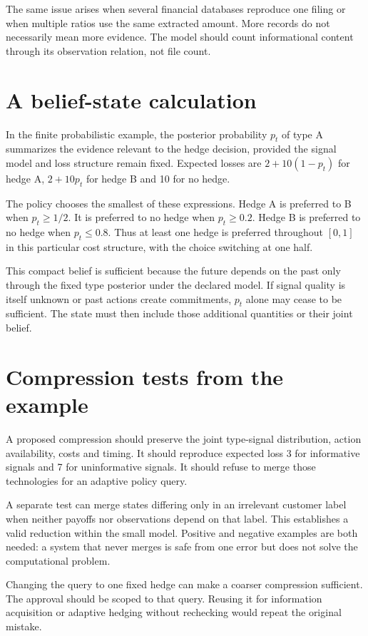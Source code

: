 The same issue arises when several financial databases reproduce one filing or when multiple ratios use the same extracted amount. More records do not necessarily mean more evidence. The model should count informational content through its observation relation, not file count.

\section{A belief-state calculation}
In the finite probabilistic example, the posterior probability $p_t$ of type A summarizes the evidence relevant to the hedge decision, provided the signal model and loss structure remain fixed. Expected losses are $2+10(1-p_t)$ for hedge A, $2+10p_t$ for hedge B and 10 for no hedge.

The policy chooses the smallest of these expressions. Hedge A is preferred to B when $p_t\geq1/2$. It is preferred to no hedge when $p_t\geq0.2$. Hedge B is preferred to no hedge when $p_t\leq0.8$. Thus at least one hedge is preferred throughout $[0,1]$ in this particular cost structure, with the choice switching at one half.

This compact belief is sufficient because the future depends on the past only through the fixed type posterior under the declared model. If signal quality is itself unknown or past actions create commitments, $p_t$ alone may cease to be sufficient. The state must then include those additional quantities or their joint belief.

\section{Compression tests from the example}
A proposed compression should preserve the joint type-signal distribution, action availability, costs and timing. It should reproduce expected loss 3 for informative signals and 7 for uninformative signals. It should refuse to merge those technologies for an adaptive policy query.

A separate test can merge states differing only in an irrelevant customer label when neither payoffs nor observations depend on that label. This establishes a valid reduction within the small model. Positive and negative examples are both needed: a system that never merges is safe from one error but does not solve the computational problem.

Changing the query to one fixed hedge can make a coarser compression sufficient. The approval should be scoped to that query. Reusing it for information acquisition or adaptive hedging without rechecking would repeat the original mistake.

